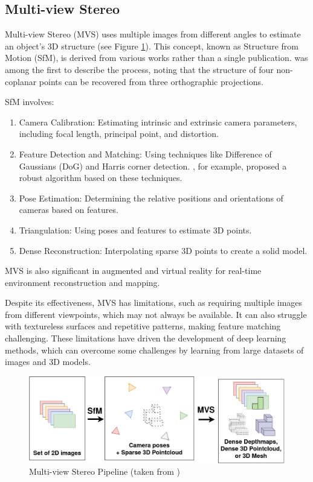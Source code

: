 \subsection{Multi-view Stereo}
Multi-view Stereo (MVS) uses multiple images from different angles to estimate an object's 3D structure (see Figure \ref{fig:multi_view_stereo}). This concept, known as Structure from Motion (SfM), is derived from various works rather than a single publication.
\textcite{ullman_interpretation_1997} was among the first to describe the process, noting that the structure of four non-coplanar points can be recovered from three orthographic projections.

SfM involves:

\begin{enumerate}
    \item Camera Calibration: Estimating intrinsic and extrinsic camera parameters, including focal length, principal point, and distortion.
    \item Feature Detection and Matching: Using techniques like Difference of Gaussians (DoG) and Harris corner detection. \textcite{furukawa_accurate_2010}, for example, proposed a robust algorithm based on these techniques.
    \item Pose Estimation: Determining the relative positions and orientations of cameras based on features.
    \item Triangulation: Using poses and features to estimate 3D points.
    \item Dense Reconstruction: Interpolating sparse 3D points to create a solid model.
\end{enumerate}

MVS is also significant in augmented and virtual reality for real-time environment reconstruction and mapping.

Despite its effectiveness, MVS has limitations, such as requiring multiple images from different viewpoints, which may not always be available.
It can also struggle with textureless surfaces and repetitive patterns, making feature matching challenging.
These limitations have driven the development of deep learning methods, which can overcome some challenges by learning from large datasets of images and 3D models.

\begin{figure}
    \centering
    \includegraphics[width=1\linewidth]{images/multi_view_stereo.png}
    \caption{Multi-view Stereo Pipeline (taken from \textcite{rouch_patchmatch_2023})}
    \label{fig:multi_view_stereo}
\end{figure}

